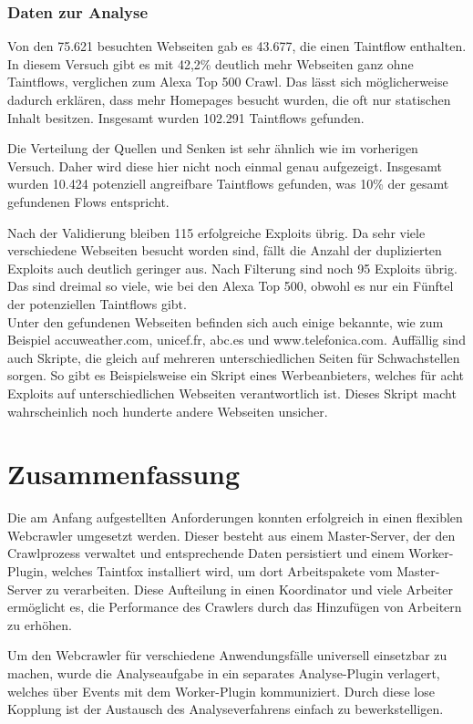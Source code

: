 \subsection{Daten zur Analyse}
Von den 75.621 besuchten Webseiten gab es 43.677, die einen Taintflow enthalten. In diesem Versuch gibt es mit  42,2\% deutlich mehr Webseiten ganz ohne Taintflows, verglichen zum Alexa Top 500 Crawl. Das lässt sich möglicherweise dadurch erklären, dass mehr Homepages besucht wurden, die oft nur statischen Inhalt besitzen. Insgesamt wurden 102.291 Taintflows gefunden.

Die Verteilung der Quellen und Senken ist sehr ähnlich wie im vorherigen Versuch. Daher wird diese hier nicht noch einmal genau aufgezeigt. Insgesamt wurden 10.424 potenziell angreifbare Taintflows gefunden, was 10\% der gesamt gefundenen Flows entspricht.

Nach der Validierung bleiben 115 erfolgreiche Exploits übrig. Da sehr viele verschiedene Webseiten besucht worden sind, fällt die Anzahl der duplizierten Exploits auch deutlich geringer aus. Nach Filterung sind noch 95 Exploits übrig. Das sind dreimal so viele, wie bei den Alexa Top 500, obwohl es nur ein Fünftel der potenziellen Taintflows gibt. \\
Unter den gefundenen Webseiten befinden sich auch einige bekannte, wie zum Beispiel accuweather.com, unicef.fr, abc.es und www.telefonica.com. Auffällig sind auch Skripte, die gleich auf mehreren unterschiedlichen Seiten für Schwachstellen sorgen. So gibt es Beispielsweise ein Skript eines Werbeanbieters, welches für acht Exploits auf unterschiedlichen Webseiten verantwortlich ist. Dieses Skript macht wahrscheinlich noch hunderte andere Webseiten unsicher.

\chapter{Zusammenfassung}
Die am Anfang aufgestellten Anforderungen konnten erfolgreich in einen flexiblen Webcrawler umgesetzt werden. Dieser besteht aus einem Master-Server, der den Crawlprozess verwaltet und entsprechende Daten persistiert und einem Worker-Plugin, welches Taintfox installiert wird, um dort Arbeitspakete vom Master-Server zu verarbeiten. Diese Aufteilung in einen Koordinator und viele Arbeiter ermöglicht es, die Performance des Crawlers durch das Hinzufügen von Arbeitern zu erhöhen. 

Um den Webcrawler für verschiedene Anwendungsfälle universell einsetzbar zu machen, wurde die Analyseaufgabe in ein separates Analyse-Plugin verlagert, welches über Events mit dem Worker-Plugin kommuniziert. Durch diese lose Kopplung ist der Austausch des Analyseverfahrens einfach zu bewerkstelligen.

